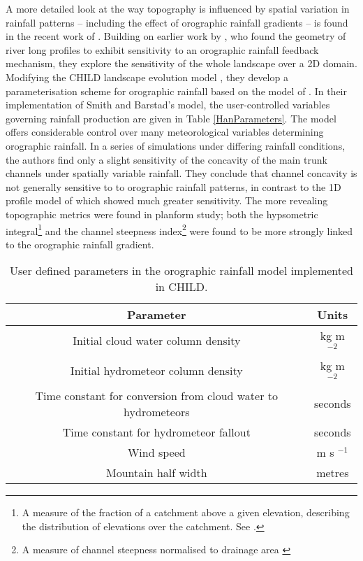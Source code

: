 A more detailed look at the way topography is influenced by spatial variation in rainfall patterns -- including the effect of orographic rainfall gradients -- is found in the recent work of \cite{han2015measuring}. Building on earlier work by \citet{Roe2002}, who found the geometry of river long profiles to exhibit sensitivity  to an orographic rainfall feedback mechanism, they explore the sensitivity of the whole landscape over a 2D domain. Modifying the CHILD landscape evolution model \citep{Tucker2001}, they develop a parameterisation scheme for orographic rainfall based on the model of \citet{smith2004linear}. In their implementation of Smith and Barstad's model, the user-controlled variables governing rainfall production are given in Table \ref{HanParameters}. The model offers considerable control over many meteorological variables determining orographic rainfall. In a series of simulations under differing rainfall conditions, the authors find only a slight sensitivity of the concavity of the main trunk channels under spatially variable rainfall. They conclude that channel concavity is not generally sensitive to to orographic rainfall patterns, in contrast to the 1D profile model of \citet{Roe2002} which showed much greater sensitivity. The more revealing topographic metrics were found in planform study; both the hypsometric integral\footnote{A measure of the fraction of a catchment above a given elevation, describing the distribution of elevations over the catchment. See \citet{brocklehurst2004hypsometry,cohen2008methodology}.} and the channel steepness index\footnote{A measure of channel steepness normalised to drainage area \citep{wobus2006tectonics}} were found to be more strongly linked to the orographic rainfall gradient. 

\label{HanParameters}
\begin{table}
\begin{tabular}{|c|c|}
\hline 
\textbf{Parameter} & \textbf{Units}  \\ 
\hline 
Initial cloud water column density & kg m \(^{-2}\) \\ 
\hline 
Initial hydrometeor column density & kg m \(^{-2}\) \\ 
\hline 
Time constant for conversion from cloud water to hydrometeors & seconds \\ 
\hline 
Time constant for hydrometeor fallout & seconds \\ 
\hline 
Wind speed & m s \(^{-1}\) \\ 
\hline 
Mountain half width & metres \\ 
\hline 
\end{tabular} 
\caption{User defined parameters in the \citet{han2015measuring} orographic rainfall model implemented in CHILD.}
\end{table}

